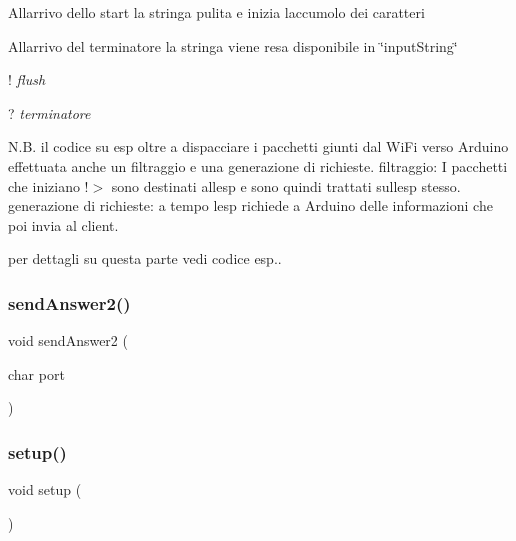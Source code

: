 All\textquotesingle{}arrivo dello start la stringa pulita e inizia l\textquotesingle{}accumolo dei caratteri

All\textquotesingle{}arrivo del terminatore la stringa viene resa disponibile in \char`\"{}input\+String\char`\"{}

! {\itshape flush}

? {\itshape terminatore}

N.\+B. il codice su esp oltre a dispacciare i pacchetti giunti dal Wi\+Fi verso Arduino effettuata anche un filtraggio e una generazione di richieste. filtraggio\+: I pacchetti che iniziano !$>$ sono destinati all\textquotesingle{}esp e sono quindi trattati sull\textquotesingle{}esp stesso. generazione di richieste\+: a tempo l\textquotesingle{}esp richiede a Arduino delle informazioni che poi invia al client.

per dettagli su questa parte vedi codice esp.. \mbox{\label{ari_pi__2_d_c__esp__08_8ino_a914ee45b85c8745eaee35cdef279a276}} 
\subsubsection{\texorpdfstring{send\+Answer2()}{sendAnswer2()}}
{\footnotesize\ttfamily void send\+Answer2 (\begin{DoxyParamCaption}\item[{char}]{port }\end{DoxyParamCaption})}

\mbox{\label{ari_pi__2_d_c__esp__08_8ino_a4fc01d736fe50cf5b977f755b675f11d}} 
\subsubsection{\texorpdfstring{setup()}{setup()}}
{\footnotesize\ttfamily void setup (\begin{DoxyParamCaption}{ }\end{DoxyParamCaption})}



